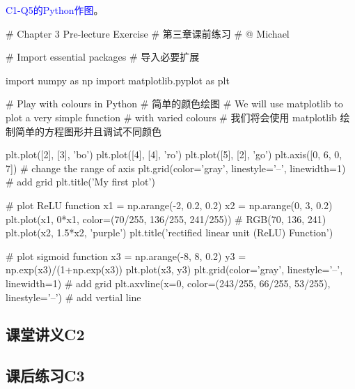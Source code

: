 \documentclass[12pt]{article}
\numberwithin{equation}{section}
\begin{document}
\noindent
\textcolor{blue}{C1-Q5的Python作图}。
\begin{python}
# Chapter 3 Pre-lecture Exercise
# 第三章课前练习
# @ Michael

# Import essential packages
# 导入必要扩展

import numpy as np
import matplotlib.pyplot as plt

# Play with colours in Python
# 简单的颜色绘图
# We will use matplotlib to plot a very simple function 
# with varied colours
# 我们将会使用 matplotlib 绘制简单的方程图形并且调试不同颜色

plt.plot([2], [3], 'bo')
plt.plot([4], [4], 'ro')
plt.plot([5], [2], 'go')
plt.axis([0, 6, 0, 7])  # change the range of axis
plt.grid(color='gray', linestyle='--', linewidth=1)  # add grid
plt.title('My first plot')


# plot ReLU function
x1 = np.arange(-2, 0.2, 0.2)
x2 = np.arange(0, 3, 0.2)
plt.plot(x1, 0*x1, color=(70/255, 136/255, 241/255))
# RGB(70, 136, 241)
plt.plot(x2, 1.5*x2, 'purple')
plt.title('rectified linear unit (ReLU) Function')


# plot sigmoid function
x3 = np.arange(-8, 8, 0.2)
y3 = np.exp(x3)/(1+np.exp(x3))
plt.plot(x3, y3)
plt.grid(color='gray', linestyle='--', linewidth=1)  # add grid
plt.axvline(x=0, color=(243/255, 66/255, 53/255), linestyle='--')
# add vertial line
\end{python}


\subsection{课堂讲义C2}



\subsection{课后练习C3}
\end{document}
